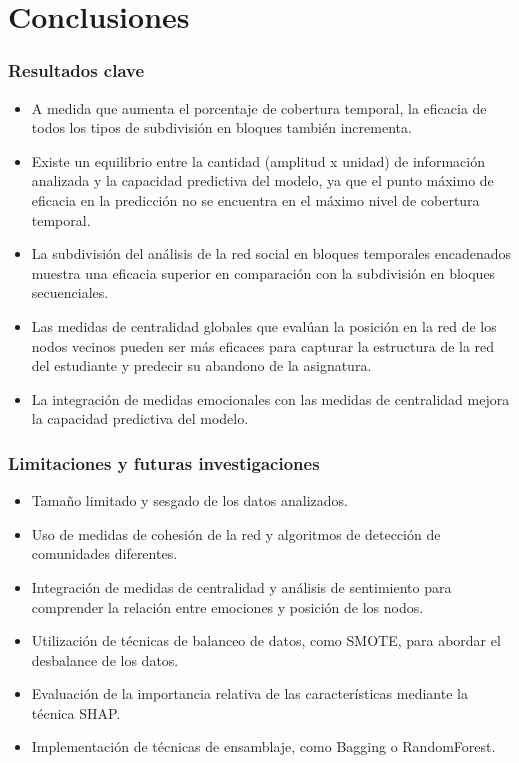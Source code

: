 \documentclass{beamer}
\begin{document}
\section{Conclusiones}
\begin{frame}
	\frametitle{Resultados clave}
  \begin{itemize}
	\item A medida que aumenta el porcentaje de cobertura temporal, la eficacia de todos los tipos de subdivisión en bloques también incrementa.
	
	\item Existe un equilibrio entre la cantidad (amplitud x unidad) de información analizada y la capacidad predictiva del modelo, ya que el punto máximo de eficacia en la predicción no se encuentra en el máximo nivel de cobertura temporal.
	
	\item La subdivisión del análisis de la red social en bloques temporales encadenados muestra una eficacia superior en comparación con la subdivisión en bloques secuenciales.
	
	\item Las medidas de centralidad globales que evalúan la posición en la red de los nodos vecinos pueden ser más eficaces para capturar la estructura de la red del estudiante y predecir su abandono de la asignatura.
	
	\item La integración de medidas emocionales con las medidas de centralidad mejora la capacidad predictiva del modelo.

\end{itemize}
\end{frame}



\begin{frame}
	\frametitle{Limitaciones y futuras investigaciones}
	
	\begin{itemize}
		\item Tamaño limitado y sesgado de los datos analizados.
		\item Uso de medidas de cohesión de la red y algoritmos de detección de comunidades diferentes.
		\item Integración de medidas de centralidad y análisis de sentimiento para comprender la relación entre emociones y posición de los nodos.
		\item Utilización de técnicas de balanceo de datos, como SMOTE, para abordar el desbalance de los datos.
		\item Evaluación de la importancia relativa de las características mediante la técnica SHAP.
		\item Implementación de técnicas de ensamblaje, como Bagging o RandomForest.
	\end{itemize}
\end{frame}
\end{document}
